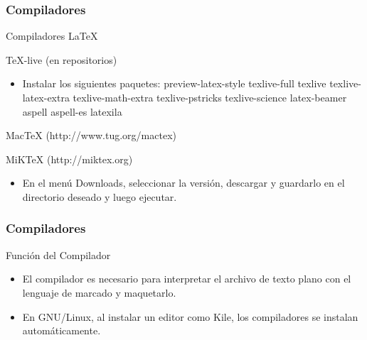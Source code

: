 \documentclass[aspectratio=43]{beamer}%
\begin{document}
\begin{frame}[fragile]
\frametitle{\textbf{Compiladores}}
\justifying
 \begin{block}{Compiladores \LaTeX{}}
\begin{description}\justifying
  \item [GNU/Linux] \TeX{}-live (en repositorios)
  \item \begin{itemize}\justifying\scriptsize
  \item[] Instalar los siguientes paquetes: preview-latex-style texlive-full texlive texlive-latex-extra texlive-math-extra texlive-pstricks texlive-science latex-beamer aspell aspell-es latexila
\end{itemize}

  \item [MacOSX] Mac\TeX{} (http://www.tug.org/mactex)
  \item [Windows] MiK\TeX{} (http://miktex.org)
  \begin{itemize}\justifying\scriptsize
  \item[] En el menú Downloads, seleccionar la versión, descargar y guardarlo en el directorio deseado y luego ejecutar.
\end{itemize}

\end{description}

\end{block}

\end{frame}


\begin{frame}[fragile]
\frametitle{\textbf{Compiladores}}
\justifying
 \begin{block}{Función del Compilador}
\begin{itemize}\justifying
  \item El compilador es necesario para interpretar el archivo de texto plano con el lenguaje de marcado y maquetarlo.
  \item En GNU/Linux, al instalar un editor como Kile, los compiladores se instalan automáticamente.
\end{itemize}

\end{block}

\end{frame}
\end{document}
